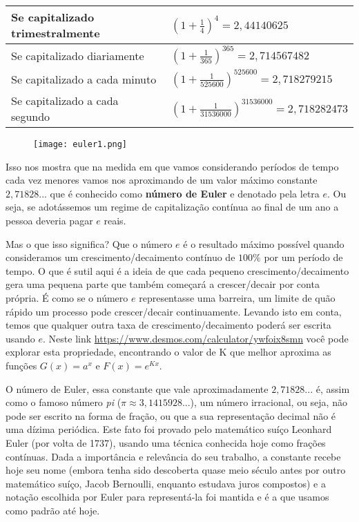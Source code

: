 \begin{knowledge} {}
\begin{center}
\renewcommand{\arraystretch}{2}
	\begin{tabular}{|l|l|}
		\hline
		Se capitalizado trimestralmente & $\left(1+\frac 14 \right)^4=2{,}44140625$                     \\ \hline
		Se capitalizado diariamente     & $\left(1+\frac 1{365} \right)^{365}=2{,}714567482$           \\ \hline
		Se capitalizado a cada minuto   & $\left(1+\frac 1{525600} \right)^{525600}=2{,}718279215$     \\ \hline
		Se capitalizado a cada segundo  & $\left(1+\frac 1{31536000} \right)^{31536000}=2{,}718282473$ \\ \hline
	\end{tabular}
\end{center}

\begin{figure}[H]
\centering
\texttt{[image: euler1.png]}
\end{figure}

Isso nos mostra que na medida em que vamos considerando períodos de tempo cada vez menores vamos nos aproximando de um valor máximo constante $2,71828...$ que é conhecido como \textbf{número de Euler} e denotado pela letra $ e $. Ou seja, se adotássemos um regime de capitalização contínua ao final de um ano a pessoa deveria pagar $e$ reais.

Mas o que isso significa? Que o número $e$ é o resultado máximo possível quando consideramos um crescimento/decaimento contínuo de $100\%$ por um período de tempo. O que é sutil aqui é a ideia de que cada pequeno crescimento/decaimento gera uma pequena parte que também começará a crescer/decair por conta própria. É como se o número $e$ representasse uma barreira, um limite de quão rápido um processo pode crescer/decair continuamente. Levando isto em conta, temos que qualquer outra taxa de crescimento/decaimento poderá ser escrita usando $e$. Neste link \url{https://www.desmos.com/calculator/ywfoix8smn} você pode explorar esta propriedade, encontrando o valor de K que melhor aproxima as funções $G(x)=a^{x}$ e $F(x)=e^{Kx}$.

O número de Euler, essa constante que vale aproximadamente $2{,}71828...$ é, assim como o famoso número \textit{pi} ($\pi \approx 3{,}1415928...$), um número irracional, ou seja, não pode ser escrito na forma de fração, ou que a sua representação decimal não é uma dízima periódica. Este fato foi provado pelo matemático suíço Leonhard Euler (por volta de 1737), usando uma técnica conhecida hoje como frações contínuas. Dada a importância e relevância do seu trabalho, a constante recebe hoje seu nome (embora tenha sido descoberta quase meio século antes por outro matemático suíço, Jacob Bernoulli, enquanto estudava juros compostos) e a notação escolhida por Euler para representá-la foi mantida e é a que usamos como padrão até hoje.


\end{knowledge}
